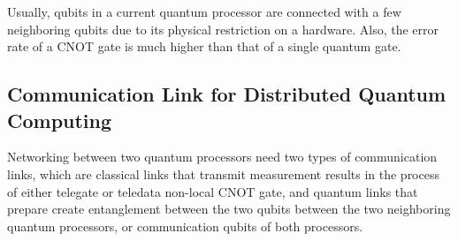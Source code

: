 Usually, qubits in a current quantum processor are connected with a few neighboring qubits due to its physical restriction on a hardware.  Also, the error rate of a CNOT gate is much higher than that of a single quantum gate.
 
 \subsection{Communication Link for Distributed Quantum Computing}
Networking between two quantum processors need two types of communication links, which are classical links that transmit measurement results in the process of either telegate or teledata non-local CNOT gate, and quantum links that prepare create entanglement between the two qubits between the two neighboring quantum processors, or communication qubits of both processors.    

%
